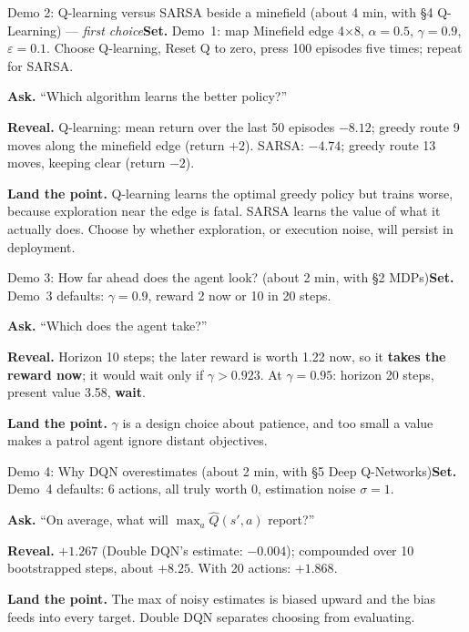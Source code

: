 \documentclass[11pt]{article}
\begin{document}
\begin{live}{Demo 2: Q-learning versus SARSA beside a minefield (about 4 min, with \S4 Q-Learning) --- \emph{first choice}}\textbf{Set.} Demo~1: map \textsf{Minefield edge 4$\times$8}, $\alpha=0.5$, $\gamma=0.9$, $\varepsilon=0.1$. Choose Q-learning, \textsf{Reset Q to zero}, press \textsf{100 episodes} five times; repeat for SARSA.\par\smallskip\textbf{Ask.} ``Which algorithm learns the better policy?''\par\smallskip\textbf{Reveal.} Q-learning: mean return over the last 50 episodes \textbf{$-8.12$}; greedy route 9 moves along the minefield edge (return $+2$). SARSA: \textbf{$-4.74$}; greedy route 13 moves, keeping clear (return $-2$).\par\smallskip\textbf{Land the point.} Q-learning learns the optimal greedy policy but trains worse, because exploration near the edge is fatal. SARSA learns the value of what it actually does. Choose by whether exploration, or execution noise, will persist in deployment.\end{live}

\begin{live}{Demo 3: How far ahead does the agent look? (about 2 min, with \S2 MDPs)}\textbf{Set.} Demo~3 defaults: $\gamma=0.9$, reward 2 now or 10 in 20 steps.\par\smallskip\textbf{Ask.} ``Which does the agent take?''\par\smallskip\textbf{Reveal.} Horizon 10 steps; the later reward is worth 1.22 now, so it \textbf{takes the reward now}; it would wait only if $\gamma>0.923$. At $\gamma=0.95$: horizon 20 steps, present value 3.58, \textbf{wait}.\par\smallskip\textbf{Land the point.} $\gamma$ is a design choice about patience, and too small a value makes a patrol agent ignore distant objectives.\end{live}

\begin{live}{Demo 4: Why DQN overestimates (about 2 min, with \S5 Deep Q-Networks)}\textbf{Set.} Demo~4 defaults: 6 actions, all truly worth 0, estimation noise $\sigma=1$.\par\smallskip\textbf{Ask.} ``On average, what will $\max_a \hat Q(s',a)$ report?''\par\smallskip\textbf{Reveal.} \textbf{$+1.267$} (Double DQN's estimate: $-0.004$); compounded over 10 bootstrapped steps, about $+8.25$. With 20 actions: $+1.868$.\par\smallskip\textbf{Land the point.} The max of noisy estimates is biased upward and the bias feeds into every target. Double DQN separates choosing from evaluating.\end{live}
\end{document}
